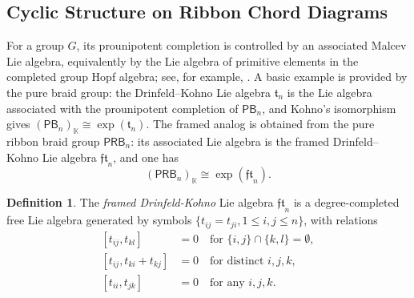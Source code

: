 \documentclass{amsart}
\newcommand{\kk}{\mathbb{K}}    %
\newcommand{\PB}{\mathsf{PB}} %
\newcommand{\PRB}{\mathsf{PRB}} %
\theoremstyle{definition}
\newtheorem{definition}[theorem]{Definition}%
\numberwithin{equation}{section}
\begin{document}
\subsection{Cyclic Structure on Ribbon Chord Diagrams}\label{subsec: Ribbon Chord Diagram}
For a group \(G\), its prounipotent completion is controlled by an associated Malcev Lie algebra, equivalently by the Lie algebra of primitive elements in the completed group Hopf algebra; see, for example, \cite[Section 8.3]{FresseBook1}. A basic example is provided by the pure braid group: the Drinfeld--Kohno Lie algebra $\mathfrak{t}_n$ is the Lie algebra associated with the prounipotent completion of $\PB_n$, and Kohno's isomorphism gives $(\PB_n)_{\kk} \cong \exp(\mathfrak{t}_n).$  The framed analog is obtained from the pure ribbon braid group $\PRB_n$: its associated Lie algebra is the framed Drinfeld--Kohno Lie algebra $\mathfrak{ft}_n$, and one has
\[
(\PRB_n)_{\kk} \cong \exp(\mathfrak{ft}_n).
\]
\begin{definition}\label{def:DK Lie algebra}
The \emph{framed Drinfeld-Kohno} Lie algebra $\mathfrak{ft}_n$ is a degree-completed free Lie algebra generated by symbols $\{t_{ij} = t_{ji}, 1\leq i,  j\leq n\}$, with relations 
\begin{equation}\label{equ:drinfeldkohno_rel}
	\begin{aligned}
	[t_{ij}, t_{kl}] &= 0 \quad \text{for $\{i,j\}\cap\{k,l\}=\emptyset$}, \\
	[t_{ij},t_{ki}+t_{kj}] &= 0 \quad \text{for distinct $i,j,k$}, \\
        [t_{ii},t_{jk}] &= 0 \quad \text{for any $i,j,k$}. \\ 
	\end{aligned}
\end{equation}
\end{definition}
\end{document}
